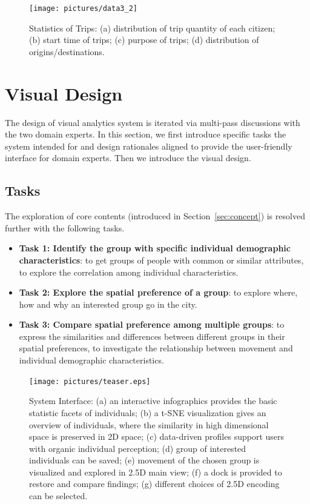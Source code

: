 \documentclass{ieeeaccess}
\begin{document}
\begin{figure}[htb!]
 \centering %
 \texttt{[image: pictures/data3\_2]}
 \caption{Statistics of Trips: (a) distribution of trip quantity of each citizen; (b) start time of trips; (c) purpose of trips; (d) distribution of origins/destinations. }
 \label{fig:data_geometry}
\end{figure}



\section{Visual Design}

The design of visual analytics system is iterated via multi-pass discussions with the two domain experts. In this section, we first introduce specific tasks the system intended for and design rationales aligned to provide the user-friendly interface for domain experts. Then we introduce the visual design.

\subsection{Tasks}

The exploration of core contents (introduced in Section~\ref{sec:concept}) is resolved further with the following tasks.

\begin{itemize}
\item \textbf{Task 1: Identify the group with specific individual demographic characteristics}: to get groups of people with common or similar attributes, to explore the correlation among individual characteristics.
\item \textbf{Task 2: Explore the spatial preference of a group}: to explore where, how and why an interested group go in the city.
\item \textbf{Task 3: Compare spatial preference among multiple groups}: to express the similarities and differences between different groups in their spatial preferences, to investigate the relationship between movement and individual demographic characteristics.
\end{itemize}

\begin{figure}[htb!]
 \centering
 \texttt{[image: pictures/teaser.eps]}
 \caption{System Interface: (a) an interactive infographics provides the basic statistic facets of individuals; (b) a t-SNE visualization gives an overview of individuals, where the similarity in high dimensional space is preserved in 2D space; (c) data-driven profiles support users with organic individual perception; (d) group of interested individuals can be saved; (e) movement of the chosen group is visualized and explored in 2.5D main view; (f) a dock is provided to restore and compare findings; (g) different choices of 2.5D encoding can be selected.}
 \label{fig:teaser}
\end{figure}
\end{document}
